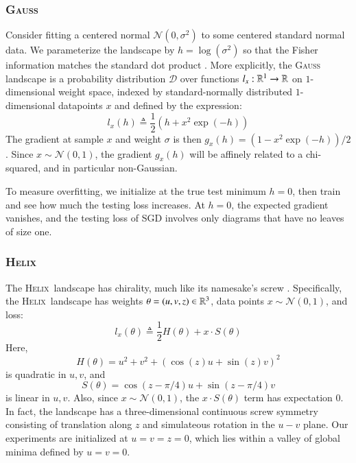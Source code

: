 \documentclass[final,12pt]{colt2021} %
\newcommand{\wrap}[1]{\left(#1\right)}
\newcommand{\Dd}{\mathcal{D}}
\newcommand{\Nn}{\mathcal{N}}   \newcommand{\NN}{\mathbb{N}}
\newcommand{\Gauss}{\textsc{Gauss}}
\newcommand{\Helix}{\textsc{Helix}}
\begin{document}
        \subsubsection{\Gauss}
            Consider fitting a centered normal $\Nn(0, \sigma^2)$ to some
            centered standard normal data.  We parameterize the landscape by
            $h=\log(\sigma^2)$ so that the Fisher information matches the
            standard dot product \citep{am98}.   
            More explicitly, the \Gauss\, landscape is a probability
            distribution $\Dd$ over functions $l_x:\mathbb{R}^1\to \mathbb{R}$ on
            $1$-dimensional weight space, indexed by standard-normally
            distributed $1$-dimensional datapoints $x$ and defined by the
            expression:
            $$
                l_x(h)
                \triangleq
                \frac{1}{2} \wrap{h + x^2 \exp(-h)}
            $$
            The gradient at sample $x$ and weight $\sigma$ is then $g_x(h) =
            (1-x^2\exp(-h))/2$.  Since $x\sim \Nn(0, 1)$, the gradient $g_x(h)$
            will be affinely related to a chi-squared, and in particular
            non-Gaussian.
            
            To measure overfitting, we initialize at the true test minimum
            $h=0$, then train and see how much the testing loss increases.  At
            $h=0$, the expected gradient vanishes, and the testing loss of SGD
            involves only diagrams that have no leaves of size one.
            
        \subsubsection{\Helix}
            The \Helix\, landscape has chirality, much like its namesake's
            screw \cite{vi00}.  Specifically, the \Helix\ landscape has
            weights     $\theta = (u,v,z) \in \mathbb{R}^3$,
            data points $x \sim \Nn(0, 1)$,
            and loss:
            $$
                l_x(\theta)
                \triangleq
                \frac{1}{2} H(\theta) + x \cdot S(\theta)
            $$
            Here,
            $$
                H(\theta) = u^2 + v^2 + (\cos(z) u + \sin(z) v)^2
            $$
            is quadratic in $u, v$, and
            $$
                S(\theta) = \cos(z-\pi/4) u + \sin(z-\pi/4) v
            $$
            is linear in $u, v$.
            Also, since $x \sim \Nn(0,1)$, the $x \cdot S(\theta)$ term has
            expectation $0$.
            In fact, the landscape has a three-dimensional continuous screw
            symmetry consisting of translation along $z$ and simulateous
            rotation in the $u-v$ plane.  Our experiments are initialized at
            $u=v=z=0$, which lies within a valley of global minima defined by
            $u=v=0$.  
\end{document}
